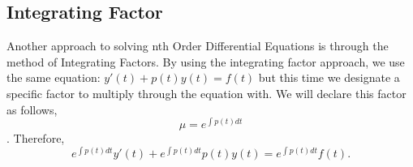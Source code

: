 \documentclass[10pt]{article}
\begin{document}
    \subsection{Integrating Factor}
    Another approach to solving nth Order Differential Equations is through the method of Integrating Factors. By using the integrating factor approach, we use the same equation: $y'(t)+p(t)y(t)=f(t)$ but this time we designate a specific factor to multiply through the equation with. We will declare this factor as follows, $$\mu=e^{\int{p(t)dt}}$$.
    Therefore, $$e^{\int{p(t)dt}}y'(t)+e^{\int{p(t)dt}}p(t)y(t)=e^{\int{p(t)dt}}f(t).$$
        
    
\end{document}
